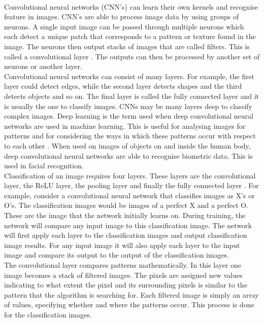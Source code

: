 \\
Convolutional neural networks (CNN's) can learn their own kernels and recognise feature in images. CNN's are able to process image data by using groups of neurons. A single input image can be passed through multiple neurons which each detect a unique patch that corresponds to a pattern or texture found in the image. The neurons then output stacks of images that are called filters. This is called a convolutional layer \cite{9}. The outputs can then be processed by another set of neurons or another layer.\newline
\\
Convolutional neural networks can consist of many layers. For example, the first layer could detect edges, while the second layer detects shapes and the third detects objects and so on. The final layer is called the fully connected layer and it is usually the one to classify images. CNNs may be many layers deep to classify complex images\cite{9}. Deep learning is the term used when deep convolutional neural networks are used in machine learning.  This is useful for analysing images for patterns and for considering the ways in which these patterns occur with respect to each other \cite{9}. When used on images of objects on and inside the human body, deep convolutional neural networks are able to recognise biometric data. This is used in facial recognition.\newline
\\
Classification of an image requires four layers. These layers are the convolutional layer, the ReLU layer, the pooling layer and finally the fully connected layer \cite{10}. 
For example, consider a convolutional neural network that classifies images as X’s or O’s. The classification images would be images of a perfect X and a perfect O. These are the image that the network initially learns on. During training, the network will compare any input image to this classification image. The network will first apply each layer to the classification images and output classification image results. For any input image it will also apply each layer to the input image and compare its output to the output of the classification images.\newline
\\
The convolutional layer compares patterns mathematically. In this layer one image becomes a stack of filtered images. The pixels are assigned new values indicating to what extent the pixel and its surrounding pixels is similar to the pattern that the algorithm is searching for. Each filtered image is simply an array of values, specifying whether and where the patterns occur. This process is done for the classification images. \newline
